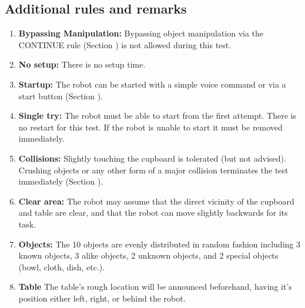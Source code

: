 
%
%
\subsection{Additional rules and remarks}
\begin{enumerate}
	\item \textbf{Bypassing Manipulation:} Bypassing object manipulation via the CONTINUE rule (Section ) is not allowed during this test.
	\item \textbf{No setup:} There is no setup time.
	\item \textbf{Startup:} The robot can be started with a simple voice command or via a start button (Section ).
	\item \textbf{Single try:} The robot must be able to start from the first attempt. There is no restart for this test. If the robot is unable to start it must be removed immediately.
	\item \textbf{Collisions:} Slightly touching the cupboard is tolerated (but not advised). Crushing objects or any other form of a major collision terminates the test immediately (Section ).
	\item \textbf{Clear area:} The robot may assume that the direct vicinity of the cupboard and table are clear, and that the robot can move slightly backwards for its task.
	\item \textbf{Objects:} The 10 objects are evenly distributed in random fashion including
	3 known objects,
	3 alike objects,
	2 unknown objects, and
	2 special objects (bowl, cloth, dish, etc.).
	\item \textbf{Table} The table's rough location will be announced beforehand, having it's position either left, right, or behind the robot.
\end{enumerate}


